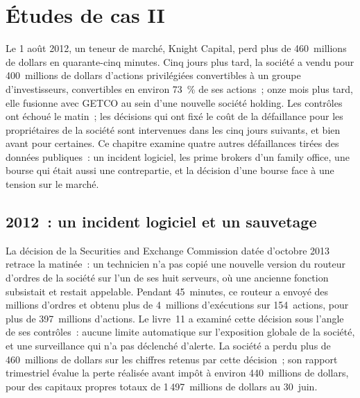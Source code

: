 \chapter{Études de cas II}\label{ch:fm:case-studies-ii}

Le 1 août 2012, un teneur de marché, Knight Capital, perd plus de 460~millions de dollars en quarante-cinq minutes. Cinq jours plus tard, la société a vendu pour 400~millions de dollars d'actions privilégiées convertibles à un groupe d'investisseurs,
convertibles en environ 73~\% de ses actions~; onze mois plus tard, elle fusionne avec GETCO au sein d'une nouvelle
société holding. Les contrôles ont échoué le matin~; les décisions qui ont fixé le coût de la défaillance pour les propriétaires de la société sont intervenues dans les cinq jours suivants, et
bien avant pour certaines. Ce chapitre examine quatre autres défaillances tirées des données publiques~: un incident logiciel, les prime brokers d'un family office, une
bourse qui était aussi une contrepartie, et la décision d'une bourse face à une tension sur le marché.

\section{2012~: un incident logiciel et un sauvetage}

La décision de la Securities and Exchange Commission datée d'octobre 2013 retrace la matinée~: un technicien n'a pas copié une nouvelle version du routeur d'ordres de
la société sur l'un de ses huit serveurs, où une ancienne fonction subsistait et restait appelable. Pendant 45~minutes, ce routeur a envoyé des millions d'ordres et obtenu plus de 4~millions d'exécutions sur 154~actions,
pour plus de 397~millions d'actions. Le livre~11 a examiné cette décision sous l'angle de ses contrôles~: aucune limite automatique sur l'exposition globale de la société, et une surveillance qui
n'a pas déclenché d'alerte. La société a perdu plus de 460~millions de dollars sur les chiffres retenus par cette décision~; son rapport trimestriel évalue la perte réalisée avant impôt à environ 440~millions de dollars,
pour des capitaux propres totaux de 1\,497~millions de dollars au 30~juin.

